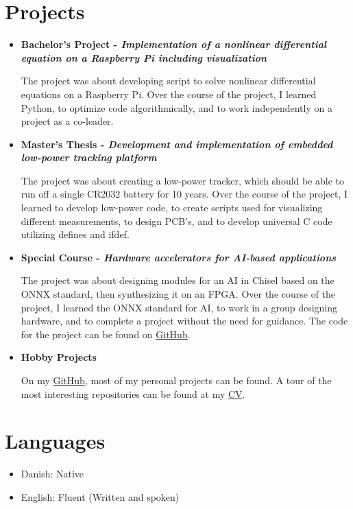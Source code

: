 \section{Projects}
	\begin{itemize}
		\item \textbf{Bachelor's Project - \textit{Implementation of a nonlinear differential equation on a Raspberry Pi including visualization}}

			The project was about developing script to solve nonlinear differential equations on a Raspberry Pi.
			Over the course of the project, I learned Python, to optimize code algorithmically, and to work independently on a project as a co-leader.

		\item \textbf{Master's Thesis - \textit{Development and implementation of embedded low-power tracking platform}}

			The project was about creating a low-power tracker, which should be able to run off a single CR2032 battery for 10 years.
			Over the course of the project, I learned to develop low-power code, to create scripts used for visualizing different measurements, to design PCB's, and to develop universal C code utilizing defines and ifdef.

		\item \textbf{Special Course - \textit{Hardware accelerators for AI-based applications}}

			The project was about designing modules for an AI in Chisel based on the ONNX standard, then synthesizing it on an FPGA.
			Over the course  of the project, I learned the ONNX standard for AI, to work in a group designing hardware, and to complete a project without the need for guidance.
			The code for the project can be found on \href{https://github.com/jondalnas/Hardware-Accelerated-Neural-Network}{GitHub}.

		\item \textbf{Hobby Projects}
			
			On my \href{https://github.com/jondalnas}{GitHub}, most of my personal projects can be found.
			A tour of the most interesting repositories can be found at my \href{https://github.com/jondalnas/CV}{CV}.
	\end{itemize}


\section{Languages}
	\begin{itemize}
		\item Danish: Native
		\item English: Fluent (Written and spoken)
	\end{itemize}

